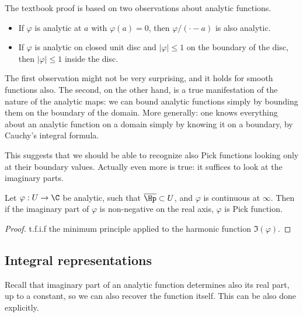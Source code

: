 The textbook proof is based on two observations about analytic functions.
\begin{itemize}
	\item If $\varphi$ is analytic at $a$ with $\varphi(a) = 0$, then $\varphi/(\cdot - a)$ is also analytic.
	\item If $\varphi$ is analytic on closed unit disc and $|\varphi| \leq 1$ on the boundary of the disc, then $|\varphi| \leq 1$ inside the disc.
\end{itemize}

The first observation might not be very surprising, and it holds for smooth functions also. The second, on the other hand, is a true manifestation of the nature of the analytic maps: we can bound analytic functions simply by bounding them on the boundary of the domain. More generally: one knows everything about an analytic function on a domain simply by knowing it on a boundary, by Cauchy's integral formula.

This suggests that we should be able to recognize also Pick functions looking only at their boundary values. Actually even more is true: it suffices to look at the imaginary parts.

\begin{prop}
	Let $\varphi : U \to \C$ be analytic, such that $\overline{\Hp} \subset U$, and $\varphi$ is continuous at $\infty$. Then if the imaginary part of $\varphi$ is non-negative on the real axis, $\varphi$ is Pick function.
\end{prop}
\begin{proof}
	t.f.i.f the minimum principle applied to the harmonic function $\Im(\varphi)$.
\end{proof}

\subsection{Integral representations}

Recall that imaginary part of an analytic function determines also its real part, up to a constant, so we can also recover the function itself. This can be also done explicitly.

